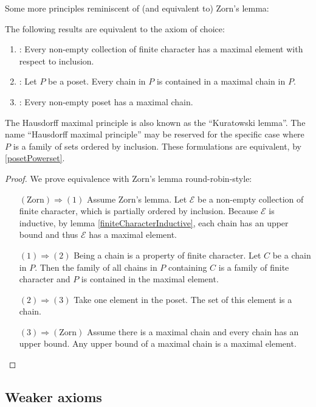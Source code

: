Some more principles reminiscent of (and equivalent to) Zorn's lemma:
\begin{theorem} \label{ZornEquivalents}
The following results are equivalent to the axiom of choice:
\begin{enumerate}
\item {}: Every non-empty collection of finite character has a maximal element with respect to inclusion.
\item {}: Let $P$ be a poset. Every chain in $P$ is contained in a maximal chain in $P$.
\item {}: Every non-empty poset has a maximal chain.
\end{enumerate}
\end{theorem}
The Hausdorff maximal principle is also known as the ``Kuratowski lemma''. The name ``Hausdorff maximal principle'' may be reserved for the specific case where $P$ is a family of sets ordered by inclusion. These formulations are equivalent, by \ref{posetPowerset}.
\begin{proof}
We prove equivalence with Zorn's lemma round-robin-style:
\begin{itemize}[leftmargin=2cm]
\item[$\boxed{(\text{Zorn}) \Rightarrow (1)}$] Assume Zorn's lemma. Let $\mathcal{E}$ be a non-empty collection of finite character, which is partially ordered by inclusion. Because $\mathcal{E}$ is inductive, by lemma \ref{finiteCharacterInductive}, each chain has an upper bound and thus $\mathcal{E}$ has a maximal element.
\item[$\boxed{(1) \Rightarrow (2)}$] Being a chain is a property of finite character. Let $C$ be a chain in $P$. Then the family of all chains in $P$ containing $C$ is a family of finite character and $P$ is contained in the maximal element.
\item[$\boxed{(2) \Rightarrow (3)}$] Take one element in the poset. The set of this element is a chain.
\item[$\boxed{(3) \Rightarrow (\text{Zorn})}$] Assume there is a maximal chain and every chain has an upper bound. Any upper bound of a maximal chain is a maximal element.
\end{itemize}
\end{proof}

\subsection{Weaker axioms}
